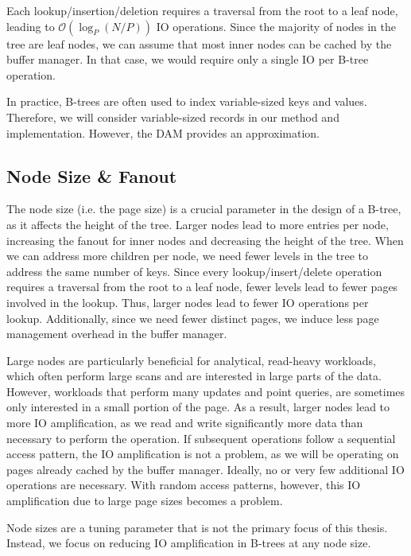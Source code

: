 Each lookup/insertion/deletion requires a traversal from the root to a leaf node, leading to $\mathcal{O}(\log_P(N/P))$ \ac{IO} operations.
Since the majority of nodes in the tree are leaf nodes, we can assume that most inner nodes can be cached by the buffer manager.
In that case, we would require only a single \ac{IO} per B-tree operation.

In practice, B-trees are often used to index variable-sized keys and values.
Therefore, we will consider variable-sized records in our method and implementation.
However, the \ac{DAM} provides an approximation.

\subsection*{Node Size \& Fanout}
\label{sec:node-size-fanout}
The node size (i.e. the page size) is a crucial parameter in the design of a B-tree, as it affects the height of the tree.
Larger nodes lead to more entries per node, increasing the fanout for inner nodes and decreasing the height of the tree.
When we can address more children per node, we need fewer levels in the tree to address the same number of keys.
Since every lookup/insert/delete operation requires a traversal from the root to a leaf node, fewer levels lead to fewer pages involved in the lookup.
Thus, larger nodes lead to fewer \ac{IO} operations per lookup.
Additionally, since we need fewer distinct pages, we induce less page management overhead in the buffer manager.

Large nodes are particularly beneficial for analytical, read-heavy workloads, which often perform large scans and are interested in large parts of the data.
However, workloads that perform many updates and point queries, are sometimes only interested in a small portion of the page.
As a result, larger nodes lead to more \ac{IO} amplification, as we read and write significantly more data than necessary to perform the operation.
If subsequent operations follow a sequential access pattern, the \ac{IO} amplification is not a problem, as we will be operating on pages already cached by the buffer manager.
Ideally, no or very few additional \ac{IO} operations are necessary.
With random access patterns, however, this \ac{IO} amplification due to large page sizes becomes a problem.

Node sizes are a tuning parameter that is not the primary focus of this thesis.
Instead, we focus on reducing \ac{IO} amplification in B-trees at any node size.

